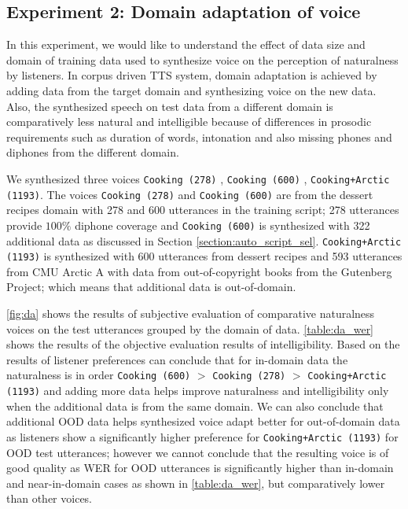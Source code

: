 \documentclass[lettersize,journal]{IEEEtran}
\begin{document}
\subsection{Experiment 2: Domain adaptation of voice}

In this experiment, we would like to understand the effect of data size and domain of training data used to synthesize voice on the perception of naturalness by listeners. In corpus driven TTS system, domain adaptation is achieved by adding data from the target domain and synthesizing voice on the new data. \cite{domain_adaptation} Also, the synthesized speech on test data from a different domain is comparatively less natural and intelligible because of differences in prosodic requirements such as duration of words, intonation and also missing phones and diphones from the different domain.\cite{Clark2004Festival2}

We synthesized three voices \verb|Cooking (278)| , \verb|Cooking (600)| , \verb|Cooking+Arctic (1193)|. The voices \verb|Cooking (278)| and \verb|Cooking (600)| are from the dessert recipes domain with 278 and 600 utterances in the training script; 278 utterances provide $100\%$ diphone coverage and \verb|Cooking (600)| is synthesized with 322 additional data as discussed in Section \ref{section:auto_script_sel}. \verb|Cooking+Arctic (1193)| is synthesized with 600 utterances from dessert recipes and 593 utterances from CMU Arctic A \cite{Kominek2004TheCA} with data from out-of-copyright books from the Gutenberg Project; which means that additional data is out-of-domain. 

\autoref{fig:da} shows the results of subjective evaluation of comparative naturalness voices on the test utterances grouped by the domain of data. \autoref{table:da_wer} shows the results of the objective evaluation results of intelligibility.  Based on the results of listener preferences can conclude that for in-domain data the naturalness is in order \verb|Cooking (600)| $>$ \verb|Cooking (278)| $>$ \verb|Cooking+Arctic (1193)| and adding more data helps improve naturalness and intelligibility only when the additional data is from the same domain. We can also conclude that additional OOD data helps synthesized voice adapt better for out-of-domain data as listeners show a significantly higher preference for \verb|Cooking+Arctic (1193)| for OOD test utterances; however we cannot conclude that the resulting voice is of good quality as WER for OOD utterances is significantly higher than in-domain and near-in-domain cases as shown in \autoref{table:da_wer}, but comparatively lower than other voices.
\end{document}
